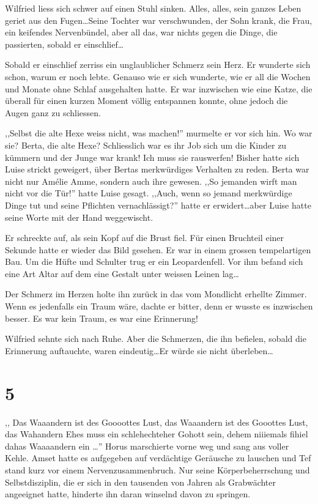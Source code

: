 \documentclass[11pt,titlepage,a5paper]{book}
\newcommand{\am}{Amélie }
\begin{document}
Wilfried liess sich schwer auf einen Stuhl sinken. Alles, alles, sein ganzes Leben geriet aus den Fugen\dots Seine Tochter war verschwunden, der Sohn krank, die Frau, ein keifendes Nervenbündel, aber all das, war nichts gegen die Dinge, die passierten, sobald er einschlief\dots

Sobald er einschlief zerriss ein unglaublicher Schmerz sein Herz. Er wunderte sich schon, warum er noch lebte. Genauso wie er sich wunderte, wie er all die Wochen und Monate ohne Schlaf ausgehalten hatte. Er war inzwischen wie eine Katze, die überall für einen kurzen Moment völlig entspannen konnte, ohne jedoch die Augen ganz zu schliessen. 

,,Selbst die alte Hexe weiss nicht, was machen!'' murmelte er vor sich hin. Wo war sie? Berta, die alte Hexe? Schliesslich war es ihr Job sich um die Kinder zu kümmern und der Junge war krank! Ich muss sie rauswerfen! Bisher hatte sich Luise strickt geweigert, über Bertas merkwürdiges Verhalten zu reden. Berta war nicht nur \am Amme, sondern auch ihre gewesen. ,,So jemanden wirft man nicht vor die Tür!'' hatte Luise gesagt. ,,Auch, wenn so jemand merkwürdige Dinge tut und seine Pflichten vernachlässigt?'' hatte er erwidert\dots aber Luise hatte seine Worte mit der Hand weggewischt.

Er schreckte auf, als sein Kopf auf die Brust fiel. Für einen Bruchteil einer Sekunde hatte er wieder das Bild gesehen. Er war in einem grossen tempelartigen Bau. Um die Hüfte und Schulter trug er ein Leopardenfell. Vor ihm befand sich eine Art Altar auf dem eine Gestalt unter weissen Leinen lag\dots 

Der Schmerz im Herzen holte ihn zurück in das vom Mondlicht erhellte Zimmer. Wenn es jedenfalls ein Traum wäre, dachte er bitter, denn er wusste es inzwischen besser. Es war kein Traum, es war eine Erinnerung!

Wilfried sehnte sich nach Ruhe. Aber die Schmerzen, die ihn befielen, sobald die Erinnerung auftauchte, waren eindeutig\dots Er würde sie nicht überleben\dots

\section*{5}

,, \eighthnote \twonotes{} Das Waaandern ist des Goooottes  Lust,  \eighthnote \twonotes{} das Waaandern ist des Gooottes Lust, das Wahandern \eighthnote \twonotes{} Ehes muss ein schlehechteher Gohott sein, \eighthnote \twonotes{} dehem niiiemals fihiel dahas Waaaandern ein\eighthnote \twonotes{} \dots '' Horus marschierte vorne weg und sang aus voller Kehle. Amset hatte es aufgegeben auf verdächtige Geräusche zu lauschen und Tef stand kurz vor einem Nervenzusammenbruch. Nur seine Körperbeherrschung und Selbstdisziplin, die er sich in den tausenden von Jahren als Grabwächter angeeignet hatte, hinderte ihn daran winselnd davon zu springen.
\end{document}

